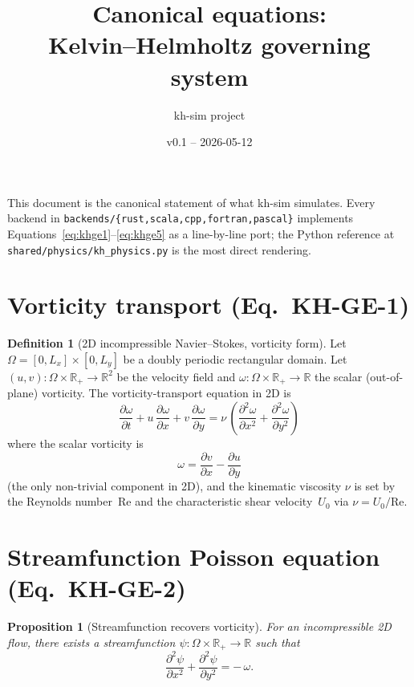 \documentclass[11pt,a4paper]{article}
\title{Canonical equations:\\ Kelvin--Helmholtz governing system}
\author{kh-sim project}
\date{v0.1 -- 2026-05-12}
\theoremstyle{definition}
\newtheorem{definition}{Definition}
\theoremstyle{plain}
\newtheorem{proposition}{Proposition}
\begin{document}
\maketitle

This document is the canonical statement of what kh-sim simulates.
Every backend in \texttt{backends/\{rust,scala,cpp,fortran,pascal\}}
implements Equations~\eqref{eq:khge1}--\eqref{eq:khge5} as a
line-by-line port; the Python reference at
\texttt{shared/physics/kh\_physics.py} is the most direct rendering.

\section{Vorticity transport (Eq.\ KH-GE-1)}

\begin{definition}[2D incompressible Navier--Stokes, vorticity form]
Let $\Omega = [0, L_x] \times [0, L_y]$ be a doubly periodic
rectangular domain. Let $(u, v)\colon \Omega \times \mathbb{R}_+ \to
\mathbb{R}^2$ be the velocity field and $\omega\colon \Omega \times
\mathbb{R}_+ \to \mathbb{R}$ the scalar (out-of-plane) vorticity.
The vorticity-transport equation in 2D is
\begin{equation}
\label{eq:khge1}
\frac{\partial \omega}{\partial t}
+ u\,\frac{\partial \omega}{\partial x}
+ v\,\frac{\partial \omega}{\partial y}
= \nu\,\left(\frac{\partial^2 \omega}{\partial x^2} + \frac{\partial^2 \omega}{\partial y^2}\right)
\tag{KH-GE-1}
\end{equation}
where the scalar vorticity is
\[
\omega = \frac{\partial v}{\partial x} - \frac{\partial u}{\partial y}
\]
(the only non-trivial component in 2D), and the kinematic viscosity
$\nu$ is set by the Reynolds number~Re and the characteristic shear
velocity~$U_0$ via $\nu = U_0/\mathrm{Re}$.
\end{definition}

\section{Streamfunction Poisson equation (Eq.\ KH-GE-2)}

\begin{proposition}[Streamfunction recovers vorticity]
For an incompressible 2D flow, there exists a streamfunction
$\psi\colon \Omega \times \mathbb{R}_+ \to \mathbb{R}$ such that
\begin{equation}
\label{eq:khge2}
\frac{\partial^2 \psi}{\partial x^2} + \frac{\partial^2 \psi}{\partial y^2}
= -\,\omega.
\tag{KH-GE-2}
\end{equation}
\end{proposition}
\end{document}
